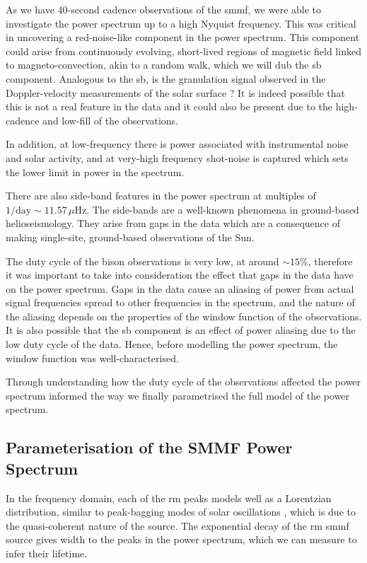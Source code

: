 As we have 40-second cadence observations of the \gls{smmf}, we were able to investigate the power spectrum up to a high Nyquist frequency. This was critical in uncovering a red-noise-like component in the power spectrum. This component could arise from continuously evolving, short-lived regions of magnetic field linked to magneto-convection, akin to a random walk, which we will dub the \gls{sb} component. Analogous to the \gls{sb}, is the granulation signal observed in the Doppler-velocity measurements of the solar surface \citep{basu_asteroseismic_2017}? It is indeed possible that this is not a real feature in the data and it could also be present due to the high-cadence and low-fill of the observations.

In addition, at low-frequency there is power associated with instrumental noise and solar activity, and at very-high frequency shot-noise is captured which sets the lower limit in power in the spectrum. 

There are also side-band features in the power spectrum at multiples of $1/\mathrm{day} \sim 11.57 \, \mu\mathrm{Hz}$. The side-bands are a well-known phenomena in ground-based helioseismology. They arise from gaps in the data which are a consequence of making single-site, ground-based observations of the Sun.

The duty cycle of the \gls{bison} observations is very low, at around $\sim 15\%$, therefore it was important to take into consideration the effect that gaps in the data have on the power spectrum. Gaps in the data cause an aliasing of power from actual signal frequencies spread to other frequencies in the spectrum, and the nature of the aliasing depends on the properties of the window function of the observations. It is also possible that the \gls{sb} component is an effect of power aliasing due to the low duty cycle of the data. Hence, before modelling the power spectrum, the window function was well-characterised.

Through understanding how the duty cycle of the observations affected the power spectrum informed the way we finally parametrised the full model of the power spectrum.


\subsection{Parameterisation of the SMMF Power Spectrum}

In the frequency domain, each of the \gls{rm} peaks models well as a Lorentzian distribution, similar to peak-bagging modes of solar oscillations \citep{handberg_bayesian_2011, davies_low-frequency_2014}, which is due to the quasi-coherent nature of the source. The exponential decay of the \gls{rm} \gls{smmf} source gives width to the peaks in the power spectrum, which we can measure to infer their lifetime.

